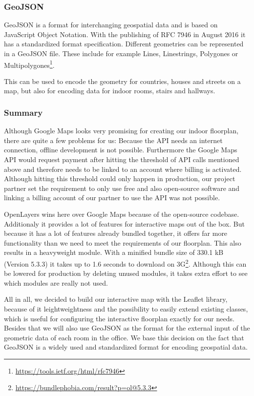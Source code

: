 \subsubsection{GeoJSON}
\label{GeoJSON}

GeoJSON is a format for interchanging geospatial data and is based on JavaScript Object Notation. With the publishing of RFC 7946 in August 2016 it has a standardized format specification.
Different geometries can be represented in a GeoJSON file. These include for example Lines, Linestrings, Polygones or Multipolygones\footnote{\url{https://tools.ietf.org/html/rfc7946}}. 

This can be used to encode the geometry for countries, houses and streets on a map, but also for encoding data for indoor rooms, stairs and hallways.

\subsubsection{Summary}

Although Google Maps looks very promising for creating our indoor floorplan, there are quite a few problems for us: Because the API needs an internet connection, offline development is not possible. 
Furthermore the Google Maps API would request payment after hitting the threshold of API calls mentioned above and therefore needs to be linked to an account where billing is activated. Although hitting this threshold could only happen in production, our project partner set the requirement to only use free and also open-source software and linking a billing account of our partner to use the API was not possible. 

OpenLayers wins here over Google Maps because of the open-source codebase. Additionaly it provides a lot of features for interactive maps out of the box.
But because it has a lot of features already bundled together, it offers far more functionality than we need to meet the requirements of our floorplan. This also results in a heavyweight module. With a minified bundle size of 330.1 kB (Version 5.3.3) it takes up to 1.6 seconds to download on 3G\footnote{\url{https://bundlephobia.com/result?p=ol@5.3.3}}. Although this can be lowered for production by deleting unused modules, it takes extra effort to see which modules are really not used.

All in all, we decided to build our interactive map with the Leaflet library, because of it leightweightness and the possibility to easily extend existing classes, which is useful for configuring the interactive floorplan exactly for our needs. Besides that we will also use GeoJSON as the format for the external input of the geometric data of each room in the office. We base this decision on the fact that GeoJSON is a widely used and standardized format for encoding geospatial data.

